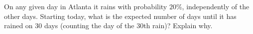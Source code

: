 On any given day in Atlanta it rains with probability $20\%$, independently of the other days. Starting today, what is the expected number of days until it has rained on $30$ days (counting the day of the $30$th rain)? Explain why.
